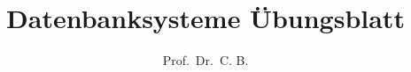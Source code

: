 


\subject{Vorlesung aus dem WS21/22}
\title{Datenbanksysteme \"Ubungsblatt}
\author{Prof. \,Dr.~C. B.}%
\date{}
\publishers{\small ge{\TeX}t von Ningh}
\maketitle
\thispagestyle{empty}
\tableofcontents
\clearpage



% 
% 
% 
% 








